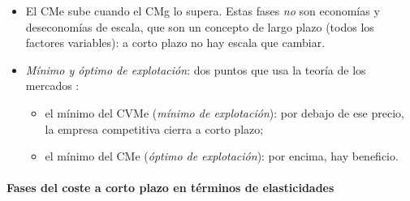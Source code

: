 \documentclass[11pt]{article}
\begin{document}
\begin{itemize}
\item El CMe sube cuando el CMg lo supera. Estas fases \emph{no} son economías y deseconomías de escala, que son un concepto de largo plazo (todos los factores variables): a corto plazo no hay escala que cambiar.
\item \emph{Mínimo y óptimo de explotación}: dos puntos que usa la teoría de los mercados :
  \begin{itemize}
  \item el mínimo del CVMe (\emph{mínimo de explotación}): por debajo de ese precio, la empresa competitiva cierra a corto plazo;
  \item el mínimo del CMe (\emph{óptimo de explotación}): por encima, hay beneficio.
  \end{itemize}
\end{itemize}

\paragraph{Fases del coste a corto plazo en términos de elasticidades}
\end{document}
